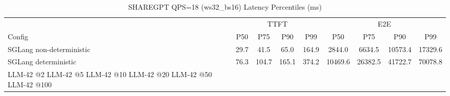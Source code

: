 \begin{table}[htbp]
\centering
\caption{SHAREGPT QPS=18 (ws32_bs16) Latency Percentiles (ms)}
\label{tab:sharegpt_qps18_ws32_bs16}
\begin{tabular}{l|cccc|cccc}
\toprule
& \multicolumn{4}{c|}{TTFT} & \multicolumn{4}{c}{E2E} \\
Config & P50 & P75 & P90 & P99 & P50 & P75 & P90 & P99 \\
\midrule
SGLang non-deterministic & 29.7 & 41.5 & 65.0 & 164.9 & 2844.0 & 6634.5 & 10573.4 & 17329.6 \\
SGLang deterministic & 76.3 & 104.7 & 165.1 & 374.2 & 10469.6 & 26382.5 & 41722.7 & 70078.8 \\
LLM-42 @2%
LLM-42 @5%
LLM-42 @10%
LLM-42 @20%
LLM-42 @50%
LLM-42 @100%
\bottomrule
\end{tabular}
\end{table}

